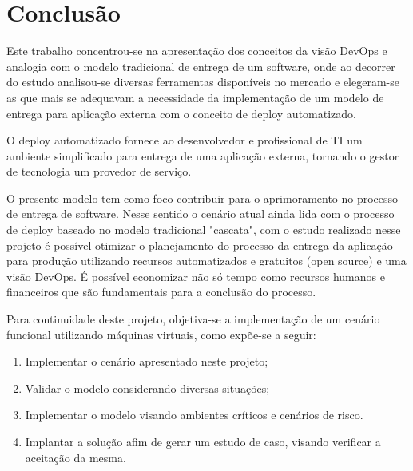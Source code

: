 \chapter{Conclusão}\label{cap:conclusao}

Este trabalho concentrou-se na apresentação dos conceitos da visão DevOps e analogia com o modelo tradicional de entrega de um software, onde ao decorrer do estudo analisou-se diversas ferramentas disponíveis no mercado e elegeram-se as que mais se adequavam a necessidade da implementação de um modelo de entrega para aplicação externa com o conceito de deploy automatizado.

O deploy automatizado fornece ao desenvolvedor e profissional de TI um ambiente simplificado para entrega de uma aplicação externa, tornando o gestor de tecnologia um provedor de serviço.

O presente modelo tem como foco contribuir para o aprimoramento no processo de entrega de software. Nesse sentido o cenário atual ainda lida com o processo de deploy baseado no modelo tradicional "cascata", com o estudo realizado nesse projeto é possível otimizar o planejamento do processo da entrega da aplicação para produção utilizando recursos automatizados e gratuitos (open source) e uma visão DevOps. É possível economizar não só tempo como recursos humanos e financeiros que são fundamentais para a conclusão do processo.

Para continuidade deste projeto, objetiva-se a implementação de um cenário funcional utilizando máquinas virtuais, como expõe-se a seguir:

\begin{enumerate}
	\item Implementar o cenário apresentado neste projeto;
	\item Validar o modelo considerando diversas situações;
	\item Implementar o modelo visando ambientes críticos e cenários de risco.
	\item Implantar a solução afim de gerar um estudo de caso, visando verificar a aceitação da mesma.
\end{enumerate}